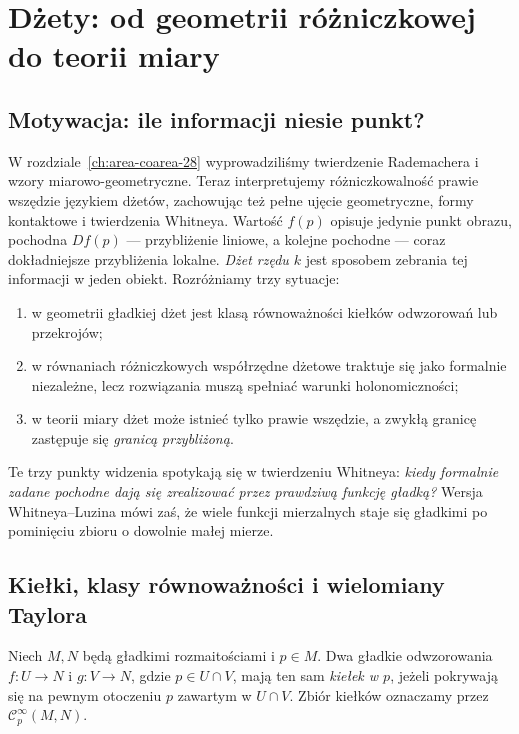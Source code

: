 \chapter{Dżety: od geometrii różniczkowej do teorii miary}
\label{ch:dzety}

\section{Motywacja: ile informacji niesie punkt?}
W rozdziale~\ref{ch:area-coarea-28} wyprowadziliśmy twierdzenie
Rademachera i wzory miarowo-geometryczne. Teraz interpretujemy
różniczkowalność prawie wszędzie językiem dżetów, zachowując też
pełne ujęcie geometryczne, formy kontaktowe i twierdzenia Whitneya.
Wartość $f(p)$ opisuje jedynie punkt obrazu, pochodna $Df(p)$ ---
przybliżenie liniowe, a kolejne pochodne --- coraz dokładniejsze
przybliżenia lokalne. \emph{Dżet rzędu $k$} jest sposobem zebrania
tej informacji w jeden obiekt. Rozróżniamy trzy sytuacje:
\begin{enumerate}
\item w geometrii gładkiej dżet jest klasą równoważności
kiełków odwzorowań lub przekrojów;
\item w równaniach różniczkowych współrzędne dżetowe
traktuje się jako formalnie niezależne, lecz rozwiązania
muszą spełniać warunki holonomiczności;
\item w teorii miary dżet może istnieć tylko prawie wszędzie,
a zwykłą granicę zastępuje się \emph{granicą przybliżoną}.
\end{enumerate}
Te trzy punkty widzenia spotykają się w twierdzeniu Whitneya:
\emph{kiedy formalnie zadane pochodne dają się zrealizować przez
prawdziwą funkcję gładką?} Wersja Whitneya--Luzina mówi zaś,
że wiele funkcji mierzalnych staje się gładkimi po pominięciu
zbioru o dowolnie małej mierze.

\section{Kiełki, klasy równoważności i wielomiany Taylora}
\begin{definicja}
\label{def:dzety-kielek}
Niech $M,N$ będą gładkimi rozmaitościami i $p\in M$.
Dwa gładkie odwzorowania $f:U\to N$ i $g:V\to N$,
gdzie $p\in U\cap V$, mają ten sam \emph{kiełek w $p$},
jeżeli pokrywają się na pewnym otoczeniu $p$ zawartym w $U\cap V$.
Zbiór kiełków oznaczamy przez $\mathcal C^\infty_p(M,N)$.
\end{definicja}


